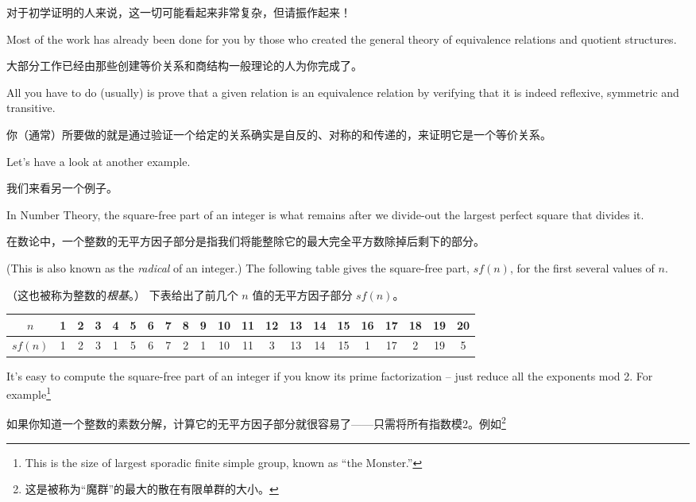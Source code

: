 对于初学证明的人来说，这一切可能看起来非常复杂，但请振作起来！

Most of the work has already been done for you by those who created
the general theory of equivalence relations and quotient structures.

大部分工作已经由那些创建等价关系和商结构一般理论的人为你完成了。

All you have
to do (usually) is prove that a given relation is an equivalence relation by verifying
that it is indeed reflexive, symmetric and transitive.

你（通常）所要做的就是通过验证一个给定的关系确实是自反的、对称的和传递的，来证明它是一个等价关系。

Let's have a look at another
example.

我们来看另一个例子。

In Number Theory, the  square-free part of an integer is what remains after we divide-out
the largest perfect square that divides it.

在数论中，一个整数的无平方因子部分是指我们将能整除它的最大完全平方数除掉后剩下的部分。

(This is also known as the 
\emph{radical} of an integer.)  
The following table gives the
square-free part, $sf(n)$, for the first several values of $n$.

（这也被称为整数的\emph{根基}。）
下表给出了前几个 $n$ 值的无平方因子部分 $sf(n)$。

\begin{center}
\begin{tabular}{c|cccccccccccccccccccc}
$n$ & 1 & 2 & 3 & 4 & 5 & 6 & 7 & 8 & 9 & 10 & 11 & 12 & 13 & 14 & 15 & 16 & 17 & 18 & 19 & 20 \\ \hline
$sf(n)$ & 1 & 2 & 3 & 1& 5 & 6 & 7  & 2  & 1 & 10 & 11  & 3 & 13 & 14 & 15 & 1 & 17 & 2  & 19 & 5 \\
\end{tabular}
\end{center}  

It's easy to compute the square-free part of an integer if you 
know its prime factorization
-- just reduce all the exponents mod 2.  For example\footnote{This is the size of largest 
sporadic finite simple group, known as ``the Monster.''}

如果你知道一个整数的素数分解，计算它的无平方因子部分就很容易了——只需将所有指数模2。例如\footnote{这是被称为“魔群”的最大的散在有限单群的大小。}

